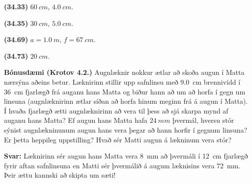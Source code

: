 \begin{tcolorbox}
\begin{enumerate*}[label = ]
  \item \textbf{(34.33)} $\SI{60}{cm}$, $\SI{4.0}{cm}$.
  \item \textbf{(34.35)} $\SI{30}{cm}$, $\SI{5.0}{cm}$.
  \item \textbf{(34.69)} $a = \SI{1.0}{m}$, $f = \SI{67}{cm}$.
  \item \textbf{(34.73)} $\SI{20}{cm}$.
\end{enumerate*}
\end{tcolorbox}

\vspace{2cm}

\textbf{Bónusdæmi (Krotov 4.2.)} Augnlæknir nokkur ætlar að skoða augun í Matta nærsýna aðeins betur. Læknirinn stillir upp safnlinsu með \SI{9.0}{cm} brennivídd í \SI{36}{cm} fjarlægð frá auganu hans Matta og biður hann að um að horfa í gegn um linsuna (augnlæknirinn ætlar síðan að horfa hinum meginn frá á augun í Matta). Í hvaða fjarlægð ætti augnlæknirinn að vera til þess að sjá skarpa mynd af auganu hans Matta? Ef augun hans Matta hafa $\SI{24}{mm}$ þvermál, hversu stór sýnist augnlækninunum augun hans vera þegar að hann horfir í gegnum linsuna? Er þetta heppileg uppstilling? Hvað sér Matti augun á lækninum vera stór?

\vspace{0.3cm}

\textbf{Svar:} Læknirinn sér augun hans Matta vera \SI{8}{mm} að þvermáli í \SI{12}{cm} fjarlægð fyrir aftan safnlinsuna en Matti sér þvermálið á augum læknisins vera \SI{72}{mm}. Þeir ættu kannski að skipta um sæti!

\newpage

